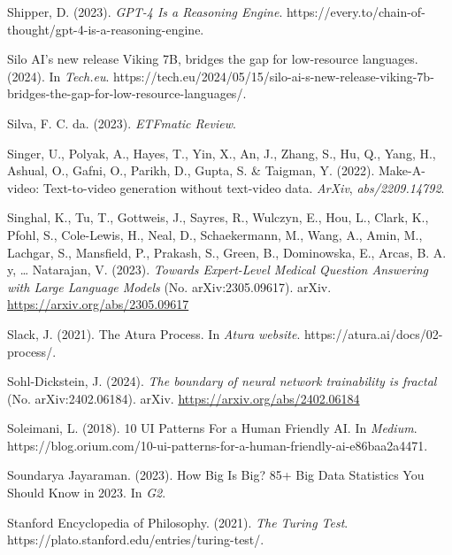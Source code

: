 \documentclass[
  letterpaper,
  DIV=11,
  numbers=noendperiod]{scrartcl}
\newlength{\cslhangindent}
\newenvironment{CSLReferences}[2] %
 {\begin{list}{}{%
  \setlength{\itemindent}{0pt}
  \setlength{\leftmargin}{0pt}
  \setlength{\parsep}{0pt}
  \ifodd #1
   \setlength{\leftmargin}{\cslhangindent}
   \setlength{\itemindent}{-1\cslhangindent}
  \fi
  \setlength{\itemsep}{#2\baselineskip}}}
 {\end{list}}
\begin{document}
\begin{CSLReferences}{1}{0}
Shipper, D. (2023). \emph{{GPT-4 Is} a {Reasoning Engine}}.
https://every.to/chain-of-thought/gpt-4-is-a-reasoning-engine.

Silo {AI}'s new release {Viking 7B}, bridges the gap for low-resource
languages. (2024). In \emph{Tech.eu}.
https://tech.eu/2024/05/15/silo-ai-s-new-release-viking-7b-bridges-the-gap-for-low-resource-languages/.

Silva, F. C. da. (2023). \emph{{ETFmatic Review}}.

Singer, U., Polyak, A., Hayes, T., Yin, X., An, J., Zhang, S., Hu, Q.,
Yang, H., Ashual, O., Gafni, O., Parikh, D., Gupta, S. \& Taigman, Y.
(2022). Make-{A-video}: {Text-to-video} generation without text-video
data. \emph{ArXiv}, \emph{abs/2209.14792}.

Singhal, K., Tu, T., Gottweis, J., Sayres, R., Wulczyn, E., Hou, L.,
Clark, K., Pfohl, S., Cole-Lewis, H., Neal, D., Schaekermann, M., Wang,
A., Amin, M., Lachgar, S., Mansfield, P., Prakash, S., Green, B.,
Dominowska, E., Arcas, B. A. y, \ldots{} Natarajan, V. (2023).
\emph{Towards {Expert-Level Medical Question Answering} with {Large
Language Models}} (No. arXiv:2305.09617). arXiv.
\url{https://arxiv.org/abs/2305.09617}

Slack, J. (2021). The {Atura Process}. In \emph{Atura website}.
https://atura.ai/docs/02-process/.

Sohl-Dickstein, J. (2024). \emph{The boundary of neural network
trainability is fractal} (No. arXiv:2402.06184). arXiv.
\url{https://arxiv.org/abs/2402.06184}

Soleimani, L. (2018). 10 {UI Patterns For} a {Human Friendly AI}. In
\emph{Medium}.
https://blog.orium.com/10-ui-patterns-for-a-human-friendly-ai-e86baa2a4471.

Soundarya Jayaraman. (2023). How {Big Is Big}? 85+ {Big Data Statistics
You Should Know} in 2023. In \emph{G2}.

Stanford Encyclopedia of Philosophy. (2021). \emph{The {Turing Test}}.
https://plato.stanford.edu/entries/turing-test/.


\end{CSLReferences}
\end{document}

